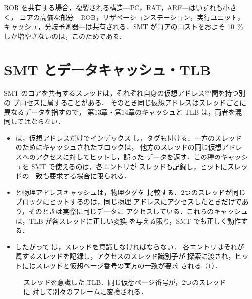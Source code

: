 \documentclass[../main.tex]{subfiles}
\begin{document}
ROB を共有する場合，複製される構造---PC，RAT，ARF---はいずれも小さく，
コアの高価な部分---ROB，リザベーションステーション，実行ユニット，
キャッシュ，分岐予測器---は共有される．SMT がコアのコストをおよそ
\SI{10}{\percent} しか増やさないのは，このためである．

\section{SMT とデータキャッシュ・TLB}
\label{sec:l18-smt-tlb}

SMT のコアを共有するスレッドは，それぞれ自身の仮想アドレス空間を持つ別の
プロセスに属することがある．%
そのとき同じ仮想アドレスはスレッドごとに異なるデータを指すので，
第13章・第14章のキャッシュと TLB は，両者を混同してはならない．
\begin{itemize}
  \item {}は，仮想アドレスだけでインデックス
    し，タグも付ける．一方のスレッドのためにキャッシュされたブロックは，
    他方のスレッドの同じ仮想アドレスへのアクセスに対してヒットし，誤った
    データを返す．この種のキャッシュを SMT で使えるのは，各エントリが
    スレッドも記録し，ヒットにスレッドの一致も要求する場合に限られる．
  \item {}と物理アドレスキャッシュは，物理タグを
    比較する．2つのスレッドが同じブロックにヒットするのは，同じ物理
    アドレスにアクセスしたときだけであり，そのときは実際に同じデータに
    アクセスしている．これらのキャッシュは，TLB が各スレッドに正しい変換
    を与える限り，SMT でも正しく動作する．
  \item したがって  は，スレッドを意識しなければならない．
    各エントリはそれが属するスレッドを記録し，アクセスのスレッド識別子が
    探索に渡され，ヒットにはスレッドと仮想ページ番号の両方の一致が要求
    される（\cref{fig:l18-smt-tlb}）．
\end{itemize}

\begin{figure}[htbp]
  \centering
  
  \caption{スレッドを意識した TLB．同じ仮想ページ番号が，2つのスレッドに
    対して別々のフレームに変換される．}
  \label{fig:l18-smt-tlb}
\end{figure}
\end{document}
